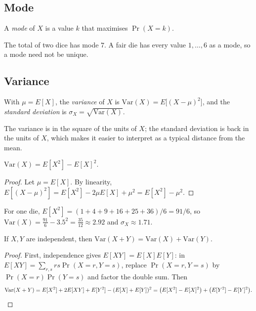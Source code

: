 \subsection{Mode}
\label{sec:10-5}

\begin{definition}[Mode]
A \emph{mode} of $X$ is a value $k$ that maximises $\Pr(X=k)$.
\end{definition}

\begin{example}
The total of two dice has mode $7$. A fair die has every value $1,\dots,6$ as a mode, so a mode need not be unique.
\end{example}

\subsection{Variance}
\label{sec:10-6}

\begin{definition}
With $\mu=E[X]$, the \emph{variance} of $X$ is $\mathrm{Var}(X) = E\big[(X-\mu)^2\big]$, and the \emph{standard deviation} is $\sigma_X = \sqrt{\mathrm{Var}(X)}$.
\end{definition}

\begin{note}[Units]
The variance is in the square of the units of $X$; the standard deviation is back in the units of $X$, which makes it easier to interpret as a typical distance from the mean.
\end{note}

\begin{proposition}
$\mathrm{Var}(X) = E[X^2] - E[X]^2$.
\end{proposition}
\begin{proof}
Let $\mu=E[X]$. By linearity, $E[(X-\mu)^2] = E[X^2]-2\mu E[X]+\mu^2 = E[X^2]-\mu^2$.
\end{proof}

\begin{example}
For one die, $E[X^2]=(1+4+9+16+25+36)/6=91/6$, so $\mathrm{Var}(X)=\frac{91}6-3.5^2=\frac{35}{12}\approx2.92$ and $\sigma_X\approx1.71$.
\end{example}

\begin{theorem}
If $X,Y$ are independent, then $\mathrm{Var}(X+Y) = \mathrm{Var}(X)+\mathrm{Var}(Y)$.
\end{theorem}
\begin{proof}
First, independence gives $E[XY]=E[X]E[Y]$: in $E[XY]=\sum_{r,s}rs\Pr(X=r,Y=s)$, replace $\Pr(X=r,Y=s)$ by $\Pr(X=r)\Pr(Y=s)$ and factor the double sum. Then
\[
\mathrm{Var}(X+Y) = E[X^2]+2E[XY]+E[Y^2] - (E[X]+E[Y])^2 = \big(E[X^2]-E[X]^2\big)+\big(E[Y^2]-E[Y]^2\big). \qedhere
\]
\end{proof}


